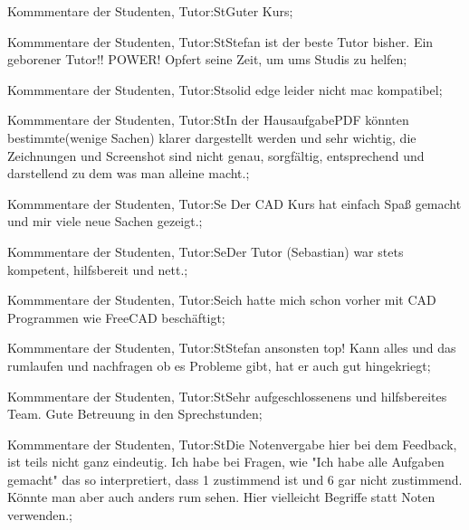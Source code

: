 \documentclass[10pt]{beamer}
\begin{document}
\begin{frame}[fragile]{Kommmentare der Studenten, Tutor:St}Guter Kurs;
 \end{frame}
\begin{frame}[fragile]{Kommmentare der Studenten, Tutor:St}Stefan ist der beste Tutor bisher. Ein geborener Tutor!! POWER! Opfert seine Zeit, um ums Studis zu helfen;
 \end{frame}
\begin{frame}[fragile]{Kommmentare der Studenten, Tutor:St}solid edge leider nicht mac kompatibel;
 \end{frame}
\begin{frame}[fragile]{Kommmentare der Studenten, Tutor:St}In der HausaufgabePDF könnten bestimmte(wenige Sachen) klarer dargestellt werden und sehr wichtig, die Zeichnungen und Screenshot sind nicht genau, sorgfältig, entsprechend und darstellend zu dem was man alleine macht.;
 \end{frame}
\begin{frame}[fragile]{Kommmentare der Studenten, Tutor:Se}
 Der CAD Kurs hat einfach Spaß gemacht und mir viele neue Sachen gezeigt.;
 \end{frame}
\begin{frame}[fragile]{Kommmentare der Studenten, Tutor:Se}Der Tutor (Sebastian) war stets kompetent, hilfsbereit und nett.;
 \end{frame}
\begin{frame}[fragile]{Kommmentare der Studenten, Tutor:Se}ich hatte mich schon vorher mit CAD Programmen wie FreeCAD beschäftigt;
 \end{frame}
\begin{frame}[fragile]{Kommmentare der Studenten, Tutor:St}Stefan ansonsten top! Kann alles und das rumlaufen und nachfragen ob es Probleme gibt, hat er auch gut hingekriegt;
 \end{frame}
\begin{frame}[fragile]{Kommmentare der Studenten, Tutor:St}Sehr aufgeschlossenens und hilfsbereites Team. Gute Betreuung in den Sprechstunden;
 \end{frame}
\begin{frame}[fragile]{Kommmentare der Studenten, Tutor:St}Die Notenvergabe hier bei dem Feedback, ist teils nicht ganz eindeutig. Ich habe bei Fragen, wie "Ich habe alle Aufgaben gemacht" das so interpretiert, dass 1 zustimmend ist und 6 gar nicht zustimmend. Könnte man aber auch anders rum sehen. Hier vielleicht Begriffe statt Noten verwenden.;
 \end{frame}
\end{document}
